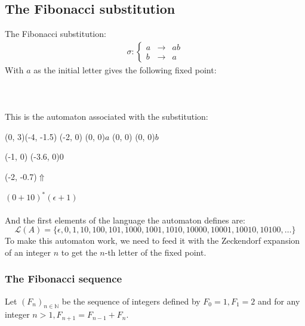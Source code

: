 \documentclass{article}
\begin{document}
\subsection{The Fibonacci substitution}
The Fibonacci substitution:
\begin{eqnarray*}
\sigma: \left\{ \begin{array}{lll}
a &\rightarrow& ab\\
b &\rightarrow& a
\end{array} \right.
\end{eqnarray*}
With $a$ as the initial letter gives the following fixed point:\\
\\
\\
\\
This is the automaton associated with the substitution:\\
\begin{graph}(0, 3)(-4, -1.5)
  (-2, 0) (0, 0){$a$}
  (0, 0)  (0, 0){$b$}

  (-1, 0) \freetext(-3.6, 0){0}
   
   

  \freetext(-2, -0.7){$\Uparrow$}
\end{graph} $(0 + 10)^* (\epsilon + 1)$\\
\\
And the first elements of the language the automaton defines are:\\
\begin{displaymath}
\mathcal{L}(A) = \{\epsilon, 0, 1, 10, 100, 101, 1000, 1001, 1010, 10000, 
10001, 10010, 10100, \ldots\}
\end{displaymath}
To make this automaton work, we need to feed it with the Zeckendorf expansion
of an integer $n$ to get the $n$-th letter of the fixed point.

\subsubsection{The Fibonacci sequence}
Let $(F_n)_{n \in \mathbb{N}}$ be the sequence of integers defined by $F_0 = 1,
F_1 = 2$ and for any integer $n > 1, F_{n + 1} = F_{n - 1} + F_n$.
\end{document}
